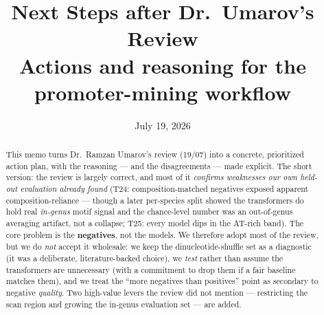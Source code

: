 \documentclass{article}
\title{Next Steps after Dr.\ Umarov's Review\\ \large Actions and reasoning for the promoter-mining workflow}
\date{July 19, 2026}
\author{}
\begin{document}
\maketitle

\begin{abstract}
This memo turns Dr.\ Ramzan Umarov's review (19/07) into a concrete, prioritized action plan, with the reasoning --- and the disagreements --- made explicit. The short version: the review is largely correct, and most of it \emph{confirms weaknesses our own held-out evaluation already found} (T24: composition-matched negatives exposed apparent composition-reliance --- though a later per-species split showed the transformers do hold real \emph{in-genus} motif signal and the chance-level number was an out-of-genus averaging artifact, not a collapse; T25: every model dips in the AT-rich band). The core problem is the \textbf{negatives}, not the models. We therefore adopt most of the review, but we do \emph{not} accept it wholesale: we keep the dinucleotide-shuffle set as a diagnostic (it was a deliberate, literature-backed choice), we \emph{test} rather than assume the transformers are unnecessary (with a commitment to drop them if a fair baseline matches them), and we treat the ``more negatives than positives'' point as secondary to negative \emph{quality}. Two high-value levers the review did not mention --- restricting the scan region and growing the in-genus evaluation set --- are added.
\end{abstract}
\end{document}
